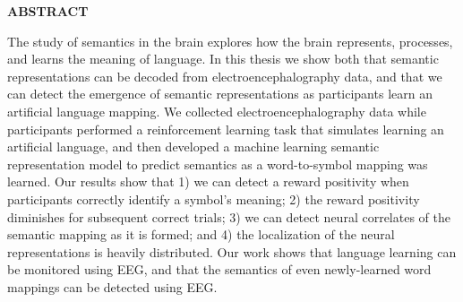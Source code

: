 \newpage
{}

\begin{center}
  \textbf{ABSTRACT}
\end{center}

The study of semantics in the brain explores how the brain represents, 
processes, and learns the meaning of language. In this thesis we show both that 
semantic representations can be decoded from electroencephalography data, and 
that we can detect the emergence of semantic representations as participants 
learn an artificial language mapping. We collected electroencephalography data 
while participants performed a reinforcement learning task that simulates 
learning an artificial language, and then developed a machine learning semantic 
representation model to predict semantics as a word-to-symbol mapping was 
learned. Our results show that 1) we can detect a reward positivity when 
participants correctly identify a symbol's meaning; 2) the reward positivity 
diminishes for subsequent correct trials; 3) we can detect neural correlates of 
the semantic mapping as it is formed; and 4) the localization of the neural 
representations is heavily distributed. Our work shows that language learning 
can be monitored using EEG, and that the semantics of even newly-learned word 
mappings can be detected using EEG.
